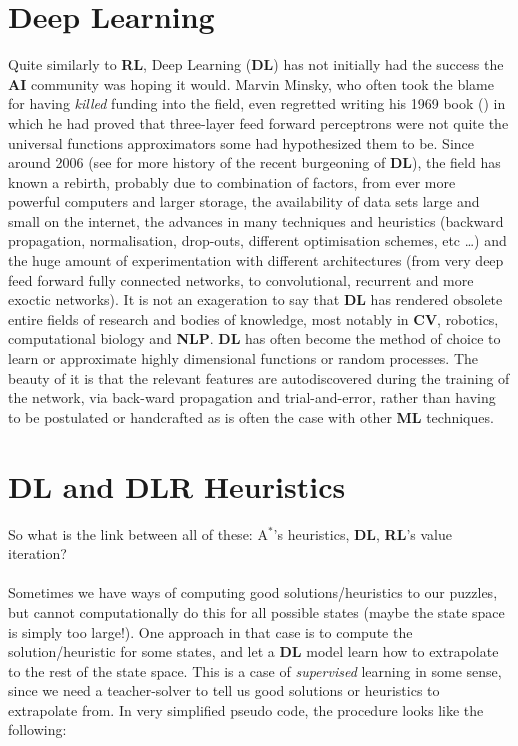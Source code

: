 \section{Deep Learning}

Quite similarly to \textbf{RL}, Deep Learning (\textbf{DL}) has not initially had the success the \textbf{AI} community was hoping it would. Marvin Minsky, who often took the blame for having \textit{killed} funding into the field, even regretted writing his 1969 book (\cite{minskypapert69}) in which he had proved that three-layer feed forward perceptrons were not quite the universal functions approximators some had hypothesized them to be. Since around 2006 (see \cite{GoodBengCour16} for more history of the recent burgeoning of \textbf{DL}), the field has known a rebirth, probably due to combination of factors, from ever more powerful computers and larger storage, the availability of data sets large and small on the internet, the advances in many techniques and heuristics (backward propagation, normalisation, drop-outs, different optimisation schemes, etc \dots) and the huge amount of experimentation with different architectures (from very deep feed forward fully connected networks, to convolutional, recurrent and more exoctic networks). It is not an exageration to say that \textbf{DL} has rendered obsolete entire fields of research and bodies of knowledge, most notably in \textbf{CV}, robotics, computational biology and \textbf{NLP}. \textbf{DL} has often become the method of choice to learn or approximate highly dimensional functions or random processes. The beauty of it is that the relevant features are autodiscovered during the training of the network, via back-ward propagation and trial-and-error, rather than having to be postulated or handcrafted as is often the case with other \textbf{ML} techniques.


\section{DL and DLR Heuristics}

So what is the link between all of these: A$^{*}$'s heuristics, \textbf{DL}, \textbf{RL}'s value iteration?
\\
\\
Sometimes we have ways of computing good solutions/heuristics to our puzzles, but cannot computationally do this for all possible states (maybe the state space is simply too large!). One approach in that case is to compute the solution/heuristic for some states, and let a \textbf{DL} model learn how to extrapolate to the rest of the state space. This is a case of \textit{supervised} learning in some sense, since we need a teacher-solver to tell us good solutions or heuristics to extrapolate from. In very simplified pseudo code, the procedure looks like the following:
\afblue
